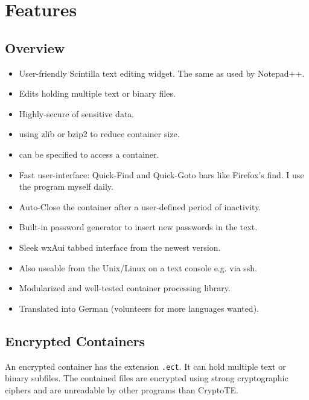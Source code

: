 \documentclass[a4paper,12pt,twoside]{article}
\begin{document}
\section{Features}\label{Features}

\subsection{Overview}\label{Overview}

\begin{itemize}
  \item User-friendly Scintilla text editing widget. The same as used by Notepad++.
  \item Edits  holding multiple text or binary files.
  \item Highly-secure  of sensitive data.
  \item {} using zlib or bzip2 to reduce container size.
  \item {} can be specified to access a container.
  \item Fast user-interface: Quick-Find and Quick-Goto bars like Firefox's find. I use the program myself daily.
  \item Auto-Close the container after a user-defined period of inactivity.
  \item Built-in password generator to insert new passwords in the text.
  \item Sleek wxAui tabbed interface from the newest  version.
  \item Also useable from the Unix/Linux  on a text console e.g. via ssh.
  \item Modularized and well-tested container processing library.
  \item Translated into German (volunteers for more languages wanted).
\end{itemize}

\subsection{Encrypted Containers}\label{Containers}

An encrypted container has the extension \texttt{.ect}. It can hold multiple text or binary subfiles. The contained files are encrypted using strong cryptographic ciphers and are unreadable by other programs than CryptoTE.
\end{document}

